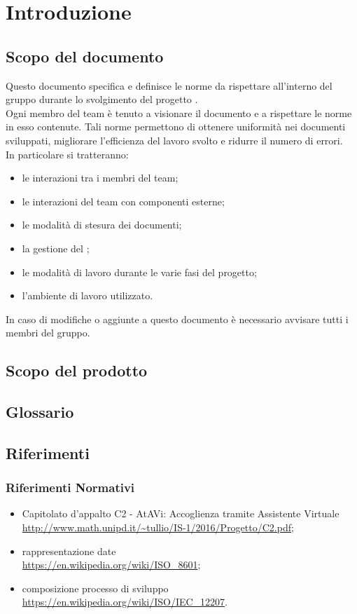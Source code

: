 \section{Introduzione}
	\subsection{Scopo del documento}
	Questo documento specifica e definisce le norme da rispettare all'interno del gruppo \GRUPPO{} durante lo svolgimento del progetto \PROGETTO. \\
	Ogni membro del team è tenuto a visionare il documento e a rispettare le norme in esso contenute. Tali norme permettono di ottenere uniformità nei documenti sviluppati,
	migliorare l'efficienza del lavoro svolto e ridurre il numero di errori. \\
	In particolare si tratteranno:
	\begin{itemize}
		\item le interazioni tra i membri del team;
		\item le interazioni del team con componenti esterne;
		\item le modalità di stesura dei documenti;
		\item la gestione del ;
		\item le modalità di lavoro durante le varie fasi del progetto;
		\item l'ambiente di lavoro utilizzato.
	\end{itemize}
	In caso di modifiche o aggiunte a questo documento è necessario avvisare tutti i membri del gruppo.
	\subsection{Scopo del prodotto}
		\SCOPO
	\subsection{Glossario}
		\GLOSSARIO
	\subsection{Riferimenti}
		\subsubsection{Riferimenti Normativi}
		\begin{itemize}
		\item Capitolato d'appalto C2 - AtAVi: Accoglienza tramite Assistente Virtuale \\
		\url{http://www.math.unipd.it/~tullio/IS-1/2016/Progetto/C2.pdf};
		\item rappresentazione date \\
		\url{https://en.wikipedia.org/wiki/ISO_8601};
		\item composizione processo di sviluppo \\
		\url{https://en.wikipedia.org/wiki/ISO/IEC_12207}.
\newpage
	\end{itemize}

